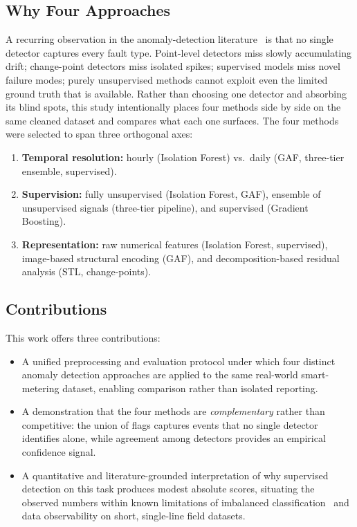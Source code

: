 \documentclass[11pt]{article}
\begin{document}
\subsection*{Why Four Approaches}
A recurring observation in the anomaly-detection literature~\cite{chandola2009anomaly,aggarwal2017outlier,aggarwal2017ensemble} is that no single detector captures every fault type. Point-level detectors miss slowly accumulating drift; change-point detectors miss isolated spikes; supervised models miss novel failure modes; purely unsupervised methods cannot exploit even the limited ground truth that is available. Rather than choosing one detector and absorbing its blind spots, this study intentionally places four methods side by side on the same cleaned dataset and compares what each one surfaces. The four methods were selected to span three orthogonal axes:

\begin{enumerate}[leftmargin=1.5em,itemsep=1pt]
  \item \textbf{Temporal resolution:} hourly (Isolation Forest) vs.\ daily (GAF, three-tier ensemble, supervised).
  \item \textbf{Supervision:} fully unsupervised (Isolation Forest, GAF), ensemble of unsupervised signals (three-tier pipeline), and supervised (Gradient Boosting).
  \item \textbf{Representation:} raw numerical features (Isolation Forest, supervised), image-based structural encoding (GAF), and decomposition-based residual analysis (STL, change-points).
\end{enumerate}

\subsection*{Contributions}
This work offers three contributions:

\begin{itemize}[leftmargin=1.5em,itemsep=1pt]
  \item A unified preprocessing and evaluation protocol under which four distinct anomaly detection approaches are applied to the same real-world smart-metering dataset, enabling comparison rather than isolated reporting.
  \item A demonstration that the four methods are \emph{complementary} rather than competitive: the union of flags captures events that no single detector identifies alone, while agreement among detectors provides an empirical confidence signal.
  \item A quantitative and literature-grounded interpretation of why supervised detection on this task produces modest absolute scores, situating the observed numbers within known limitations of imbalanced classification~\cite{saito2015precision,hand2009measuring} and data observability on short, single-line field datasets.
\end{itemize}
\end{document}
